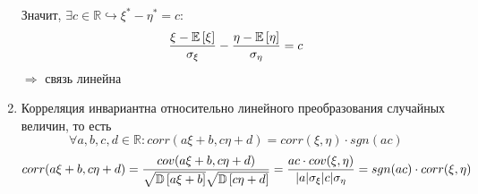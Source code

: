 \documentclass[a4paper, 10pt]{article}
\begin{document}
\begin{enumerate}
    Значит, $\exists c\in\mathbb{R}\hookrightarrow\xi^*-\eta^*=c:$ 
    \begin{equation*}
        \frac{\xi-\mathbb{E}\left[\xi\right]}{\sigma_\xi}-\frac{\eta-\mathbb{E}\left[\eta\right]}{\sigma_\eta}=c
    \end{equation*}
    $\Longrightarrow$ связь линейна

    \item Корреляция инвариантна относительно линейного преобразования случайных величин, то есть
    \begin{equation*}
        \forall a,b,c,d\in\mathbb{R}: corr(a\xi+b,c\eta+d)=corr(\xi,\eta)\cdot sgn(ac)
    \end{equation*}
    \proof 
    \begin{equation*}
        corr(a\xi+b,c\eta+d)=\frac{cov(a\xi+b,c\eta+d)}{\sqrt{\mathbb{D}\left[a\xi+b\right]}\sqrt{\mathbb{D}\left[c\eta+d\right]}}=\frac{ac\cdot cov(\xi,\eta)}{|a|\sigma_\xi|c|\sigma_\eta}=sgn(ac)\cdot corr(\xi,\eta)
    \end{equation*}
\end{enumerate}

\end{document}
